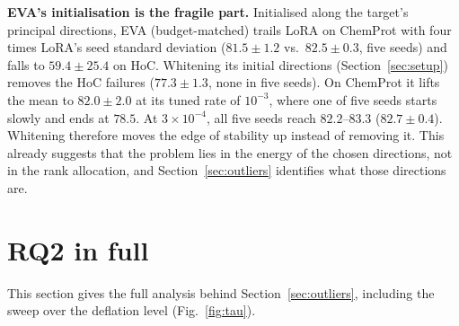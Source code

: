\documentclass[conference,onecolumn]{IEEEtran}
\begin{document}
\noindent\textbf{EVA's initialisation is the fragile part.} Initialised along
the target's principal directions, EVA (budget-matched) trails LoRA on ChemProt
with four times LoRA's seed standard deviation ($81.5\pm1.2$ vs.\ $82.5\pm0.3$,
five seeds) and falls to $59.4\pm25.4$ on HoC. Whitening its initial directions
(Section~\ref{sec:setup}) removes the HoC failures ($77.3\pm1.3$, none in five
seeds). On ChemProt it lifts the mean to $82.0\pm2.0$ at its tuned rate of
$10^{-3}$, where one of five seeds starts slowly and ends at $78.5$. At
$3\times10^{-4}$, all five seeds reach $82.2$--$83.3$ ($82.7\pm0.4$). Whitening
therefore moves the edge of stability up instead of removing it. This already
suggests that the problem lies in the energy of the chosen directions, not in
the rank allocation, and Section~\ref{sec:outliers} identifies what those
directions are.

\section{RQ2 in full}
\label{sup:rq2}
This section gives the full analysis behind Section~\ref{sec:outliers}, including the sweep over the deflation level (Fig.~\ref{fig:tau}).
\end{document}
